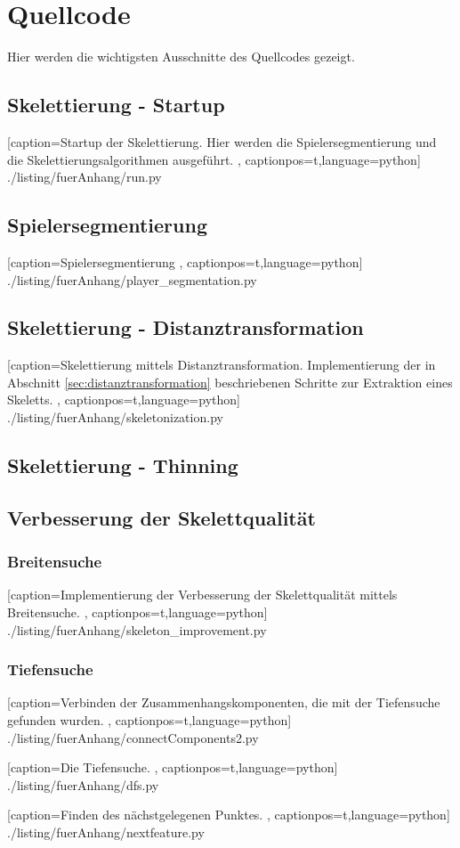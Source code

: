 \chapter{Quellcode}
\label{anhang:quellcode}
Hier werden die wichtigsten Ausschnitte des Quellcodes gezeigt. 
\section{Skelettierung - Startup}
 
    [caption={Startup der Skelettierung. Hier werden die Spielersegmentierung und die Skelettierungsalgorithmen ausgeführt.}
       \label{lst:startup},
       captionpos=t,language=python]
 {./listing/fuerAnhang/run.py}
\section{Spielersegmentierung}
\label{anhang:segmentierung}

    [caption={Spielersegmentierung}
       \label{lst:anhang_spielersegmentierung},
       captionpos=t,language=python]
 {./listing/fuerAnhang/player_segmentation.py}
\section{Skelettierung - Distanztransformation}

    [caption={Skelettierung mittels Distanztransformation. Implementierung der in Abschnitt \ref{sec:distanztransformation} beschriebenen Schritte zur Extraktion eines Skeletts.}
       \label{lst:anhang_distanztransformation},
       captionpos=t,language=python]
 {./listing/fuerAnhang/skeletonization.py}
\section{Skelettierung - Thinning}
\section{Verbesserung der Skelettqualität}
\subsection{Breitensuche}
 
    [caption={Implementierung der Verbesserung der Skelettqualität mittels Breitensuche.}
       \label{lst:breitensuche},
       captionpos=t,language=python]
 {./listing/fuerAnhang/skeleton_improvement.py}
 \newpage
\subsection{Tiefensuche}

    [caption={Verbinden der Zusammenhangskomponenten, die mit der Tiefensuche gefunden wurden.}
       \label{lst:connectcomponents},
       captionpos=t,language=python]
 {./listing/fuerAnhang/connectComponents2.py}
 
 
     [caption={Die Tiefensuche.}
        \label{lst:tiefensuche},
        captionpos=t,language=python]
  {./listing/fuerAnhang/dfs.py}
  
 
      [caption={Finden des nächstgelegenen Punktes.}
         \label{lst:findnextfeature},
         captionpos=t,language=python]
   {./listing/fuerAnhang/nextfeature.py}